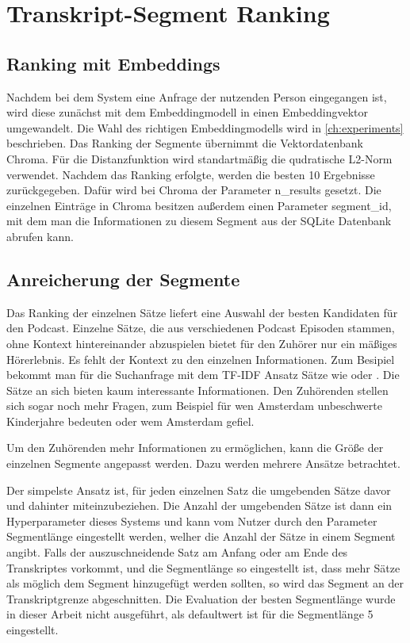 \section{Transkript-Segment Ranking}

\subsection{Ranking mit Embeddings}

Nachdem bei dem System eine Anfrage der nutzenden Person eingegangen ist, wird diese zunächst mit dem Embeddingmodell in einen Embeddingvektor umgewandelt. 
Die Wahl des richtigen Embeddingmodells wird in \autoref{ch:experiments} beschrieben.
Das Ranking der Segmente übernimmt die Vektordatenbank Chroma.
Für die Distanzfunktion wird standartmäßig die qudratische L2-Norm verwendet.
Nachdem das Ranking erfolgte, werden die besten 10 Ergebnisse zurückgegeben.
Dafür wird bei Chroma der Parameter n_results gesetzt.
Die einzelnen Einträge in Chroma besitzen außerdem einen Parameter segment_id, mit dem man die Informationen zu diesem Segment aus der SQLite Datenbank abrufen kann.


\subsection{Anreicherung der Segmente}

Das Ranking der einzelnen Sätze liefert eine Auswahl der besten Kandidaten für den Podcast.
Einzelne Sätze, die aus verschiedenen Podcast Episoden stammen, ohne Kontext hintereinander abzuspielen bietet für den Zuhörer nur ein mäßiges Hörerlebnis. 
Es fehlt der Kontext zu den einzelnen Informationen.
Zum Besipiel bekommt man für die Suchanfrage  mit dem TF-IDF Ansatz Sätze wie  oder .
Die Sätze an sich bieten kaum interessante Informationen.
Den Zuhörenden stellen sich sogar noch mehr Fragen, zum Beispiel für wen Amsterdam unbeschwerte Kinderjahre bedeuten oder wem Amsterdam gefiel.

Um den Zuhörenden mehr Informationen zu ermöglichen, kann die Größe der einzelnen Segmente angepasst werden.
Dazu werden mehrere Ansätze betrachtet.

Der simpelste Ansatz ist, für jeden einzelnen Satz die umgebenden Sätze davor und dahinter miteinzubeziehen.
Die Anzahl der umgebenden Sätze ist dann ein Hyperparameter dieses Systems und kann vom Nutzer durch den Parameter Segmentlänge eingestellt werden, welher die Anzahl der Sätze in einem Segment angibt.
Falls der auszuschneidende Satz am Anfang oder am Ende des Transkriptes vorkommt, und die Segmentlänge so eingestellt ist, dass mehr Sätze als möglich dem Segment hinzugefügt werden sollten, so wird das Segment an der Transkriptgrenze abgeschnitten.
Die Evaluation der besten Segmentlänge wurde in dieser Arbeit nicht ausgeführt, als defaultwert ist für die Segmentlänge 5 eingestellt.


